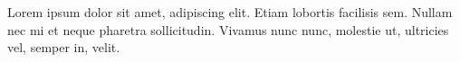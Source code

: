 \documentclass{article}
\begin{document}
    \beginnumbering
    \pstart
    Lorem ipsum dolor sit amet,
     adipiscing elit. Etiam
    lobortis facilisis sem. Nullam nec mi et neque pharetra
    sollicitudin. Vivamus nunc nunc, molestie ut, ultricies vel,
    semper in, velit.
    \pend
    \endnumbering
\end{document}

